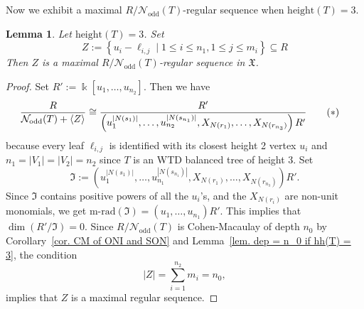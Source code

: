 \documentclass[12pt, reqno]{amsart}
\theoremstyle{definition}
\theoremstyle{plain}
\newtheorem{lemma}[theorem]{Lemma}
\theoremstyle{definition}
\newcommand{\hh}{\mbox{height}}
\newcommand{\kk}{\Bbbk}
\newcommand{\mrad}{\mbox{m-rad}}
\newcommand\gen[1]{\left\langle #1 \right\rangle}
\newcommand\Set[2]{\left\lbrace #1 \mid #2 \right\rbrace}
\newcommand{\NN}{\mathcal{N}}
\begin{document}
Now we exhibit a maximal $R/\NN_{\text{odd}}(T)$-regular sequence when $\hh(T) = 3$.

\begin{lemma}\label{lem. max reg. seq. for height 3 D.T}
    Let $\hh(T) = 3$.
    Set
    $$
    Z := \Set{u_i - \ell_{i,j}}{1 \leq i \leq n_1, 1 \leq j \leq m_i} \subseteq R
    $$
    Then $Z$ is a maximal $R/\NN_{\text{odd}}(T)$-regular sequence in $\mathfrak{X}$.
\end{lemma}

\begin{proof}
Set $R' := \kk[u_1,\dots,u_{n_2}]$.
Then we have
\begin{align*}
\frac{R}{\NN_{\text{odd}}(T) + \gen{Z}} &\cong \frac{R'}{\left(u_1^{|N(s_1)|}, \dots ,u_{n_2}^{|N(s_{n_1})|}, X_{N(r_1)}, \dots ,X_{N(r_{n_3})}\right)R'} \tag{\textasteriskcentered{}}
\end{align*}
because every leaf $\ell_{i,j}$ is identified with its closest height 2 vertex $u_i$ and $n_1 = |V_1| = |V_2| = n_2$ since $T$ is an WTD balanced tree of height 3. 
Set 
$$
\mathfrak{I} := \left(u_1^{|N(s_1)|}, \dots ,u_{n_1}^{|N(s_{n_1})|}, X_{N(r_1)}, \dots ,X_{N(r_{n_3})}\right)R'.
$$
Since $\mathfrak{I}$ contains positive powers of all the $u_i$'s, and the $X_{N(r_i)}$ are non-unit monomials, we get $\mrad(\mathfrak{I}) = (u_1,\dots,u_{n_1})R'$.
This implies that $\dim(R'/\mathfrak{I}) = 0$.
Since $R/\NN_{\text{odd}}(T)$ is Cohen-Macaulay of depth $n_0$ by Corollary~\ref{cor. CM of ONI and SON} and Lemma~\ref{lem. dep = n_0 if hh(T) = 3}, the condition
$$
|Z| = \sum_{i = 1}^{n_2}m_i = n_0,
$$
implies that $Z$ is a maximal regular sequence.
\end{proof}
\end{document}
